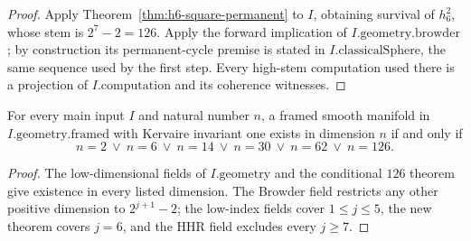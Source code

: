 \begin{proof}
  Apply Theorem~\ref{thm:h6-square-permanent} to $I$, obtaining survival of
  $h_6^2$, whose stem is $2^7-2=126$.  Apply the forward implication of
  $I.\mathrm{geometry}.\mathrm{browder}$; by construction its permanent-cycle
  premise is stated in $I.\mathrm{classicalSphere}$, the same sequence used by
  the first step.  Every high-stem computation used there is a projection of
  $I.\mathrm{computation}$ and its coherence witnesses.
\end{proof}

\begin{corollary}
  \label{cor:kervaire-dimensions-exact}
  \notready
  For every main input $I$ and natural number $n$, a framed smooth manifold in
  $I.\mathrm{geometry}.\mathrm{framed}$ with Kervaire invariant one exists in
  dimension $n$ if and only if
  \[
    n=2\ \vee\ n=6\ \vee\ n=14\ \vee\ n=30\ \vee\ n=62\ \vee\ n=126.
  \]
\end{corollary}

\begin{proof}
  The low-dimensional fields of $I.\mathrm{geometry}$ and the conditional
  $126$ theorem give existence in every listed dimension.  The Browder field
  restricts any other positive dimension to $2^{j+1}-2$; the low-index fields
  cover $1\le j\le5$, the new theorem covers $j=6$, and the HHR field excludes
  every $j\ge7$.
\end{proof}

